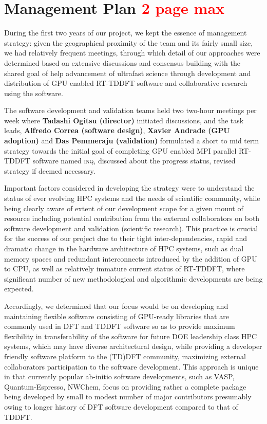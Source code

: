 \section{Management Plan \textcolor{red}{2 page max}}
\label{sec:manage}

During the first two years of our project, we kept the essence of management strategy: given the geographical proximity of the team and its fairly small size, we had relatively frequent meetings, through which detail of our approaches were determined based on extensive discussions and consensus building with the shared goal of help advancement of ultrafast science through development and distribution of GPU enabled RT-TDDFT software and collaborative research using the software. 

The software development and validation teams held two two-hour meetings per week where {\bf Tadashi Ogitsu (director)} initiated discussions, and the task leads, {\bf Alfredo Correa (software design)}, {\bf Xavier Andrade (GPU adoption)} and {\bf Das Pemmeraju (validation)} formulated a short to mid term strategy towards the initial goal of completing GPU enabled MPI parallel RT-TDDFT software named \textsc{inq}, discussed about the progress status, revised strategy if deemed necessary.

Important factors considered in developing the strategy were to understand the status of ever evolving HPC systems and the needs of scientific community, while being clearly aware of extent of our development scope for a given mount of resource including potential contribution from the external collaborators on both software development and validation (scientific research). 
This practice is crucial for the success of our project due to their tight inter-dependencies, rapid and dramatic change in the hardware architecture of HPC systems, such as dual memory spaces and redundant interconnects introduced by the addition of GPU to CPU, as well as relatively immature current status of RT-TDDFT, where significant number of new methodological and algorithmic developments are being expected. 

Accordingly, we determined that our focus would be on developing and maintaining flexible software consisting of GPU-ready libraries that are commonly used in DFT and TDDFT software so as to provide maximum flexibility in transferability of the software for future DOE leadership class HPC systems, which may have diverse architectural design, while providing a developer friendly software platform to the (TD)DFT community, maximizing external collaborators participation to the software development. 
This approach is unique in that currently popular ab-initio software developments, such as VASP, Quantum-Espresso, NWChem, focus on providing rather a complete package being developed by small to modest number of major contributors presumably owing to longer history of DFT software development compared to that of TDDFT.

